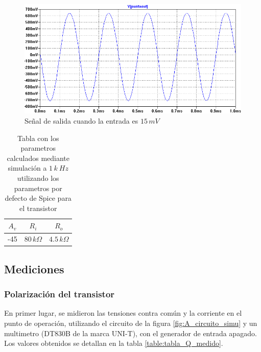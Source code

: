 \documentclass[10pt,spanish,a4paper,notitlepage]{article}
\begin{document}
\begin{figure}[H]
\centering
\includegraphics[scale=0.7]{simulaciones/A_trans15.png}
\caption{Señal de salida cuando la entrada es $15\,\unit{mV}$ }
\label{fig:A_trans15}
\end{figure}

\begin{table}[H]
    \centering
    \begin{tabular}{|c|c|c|} %
    \hline
    $A_v$ & $R_i$  & $R_o$ \\ \hline
     -45 & $80\,\unit{k\Omega}$  & $4.5\,\unit{k\Omega}$   \\ \hline
    \end{tabular}
    \caption{Tabla con los parametros calculados mediante simulación a $1\,\unit{k\ Hz}$ utilizando los parametros por defecto de Spice para el transistor}
    \label{table:param_simu}
    \end{table}



\subsection{Mediciones}

\subsubsection{Polarización del transistor}
En primer lugar, se midieron las tensiones contra común y la corriente en el punto de operación, utilizando el circuito de la figura \ref{fig:A_circuito_simu} y un multimetro (DT830B de la marca UNI-T), con el generador de entrada apagado. Los valores obtenidos se detallan en la tabla \ref{table:tabla_Q_medido}.
\end{document}
